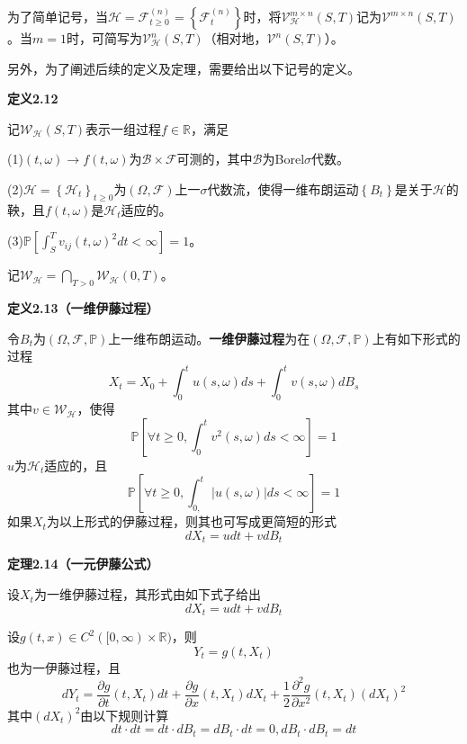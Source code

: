 \documentclass[UTF8，12pt]{ctexart}
\numberwithin{equation}{section}
\begin{document}
为了简单记号，当$\mathcal{H}=\mathcal{F}^{(n)}_{t\ge 0}=\left\{\mathcal{F}_t^{(n)}\right\}$时，将$\mathcal{V}_\mathcal{H}^{m\times n}(S,T)$记为$\mathcal{V}^{m\times n}(S,T)$。当$m=1$时，可简写为$\mathcal{V}_\mathcal{H}^n(S,T)$（相对地，$\mathcal{V}^n(S,T)$）。

\vspace{0.3cm}
另外，为了阐述后续的定义及定理，需要给出以下记号的定义。

\vspace{0.3cm}
\noindent \textbf{定义2.12}

记$\mathcal{W}_\mathcal{H}(S,T)$表示一组过程$f\in\mathbb{R}$，满足

\noindent (1)$(t,\omega)\to f(t,\omega)$为$\mathcal{B}\times\mathcal{F}$可测的，其中$\mathcal{B}$为Borel$\sigma$代数。

\noindent (2)$\mathcal{H}=\left\{\mathcal{H}_t\right\}_{t\ge 0}$为$(\Omega,\mathcal{F})$上一$\sigma$代数流，使得一维布朗运动$\left\{B_t\right\}$是关于$\mathcal{H}$的鞅，且$f(t,\omega)$是$\mathcal{H}_t$适应的。

\noindent (3)$\mathbb{P}\left[ \int_{S}^{T}v_{ij}(t,\omega)^2 dt <\infty\right]=1$。

\noindent 记$\mathcal{W}_\mathcal{H}=\bigcap_{T>0}\mathcal{W}_\mathcal{H}(0,T)$。

\vspace{0.3cm}
\noindent \textbf{定义2.13（一维伊藤过程）}

令$B_t$为$(\Omega,\mathcal{F},\mathbb{P})$上一维布朗运动。\textbf{一维伊藤过程}为在$(\Omega,\mathcal{F},\mathbb{P})$上有如下形式的过程
\[
X_t=X_0+\int_{0}^{t}u(s,\omega)ds+\int_{0}^{t}v(s,\omega)dB_s
\]
其中$v\in\mathcal{W}_\mathcal{H}$，使得
\[
\mathbb{P}\left[\forall t\ge 0,\int_{0}^{t}v^2(s,\omega)ds<\infty\right]=1
\]
$u$为$\mathcal{H}_t$适应的，且
\[
\mathbb{P}\left[\forall t\ge 0,\int_{0,}^{t}\left\vert u(s,\omega)\right\vert ds<\infty\right]=1
\]
如果$X_t$为以上形式的伊藤过程，则其也可写成更简短的形式
\[
dX_t=udt+vdB_t
\]

\vspace{0.3cm}
\noindent \textbf{定理2.14（一元伊藤公式）}

设$X_t$为一维伊藤过程，其形式由如下式子给出
\[
dX_t=udt+vdB_t
\]

设$g(t,x)\in C^2([0,\infty)\times\mathbb{R})$，则
\[
Y_t=g(t,X_t)
\]
也为一伊藤过程，且
\[
dY_t=\frac{\partial g}{\partial t}(t,X_t)dt+\frac{\partial g}{\partial x}(t,X_t)dX_t+\frac{1}{2}\frac{\partial^2 g}{\partial x^2}(t,X_t)(dX_t)^2
\]
其中$(dX_t)^2$由以下规则计算
\[
dt\cdot dt=dt\cdot dB_t=dB_t\cdot dt=0,dB_t\cdot dB_t=dt
\]
\end{document}
